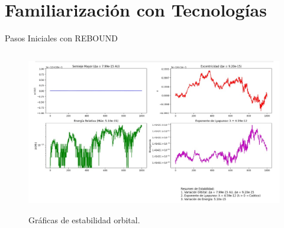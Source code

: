 \section[Familiarización]{Familiarización con Tecnologías}
\begin{frame}{Pasos Iniciales con REBOUND}
    \begin{columns}[T]
        \begin{column}{0.55\textwidth}
            \begin{figure}
                \centering
                \href{run:C:/Users/emicr/Documents/CODIGOS_FUENTES/TrabajoTerminal/collision_of_two_bodies/tests/prueba_2.ipynb}{%
                \includegraphics[width=\textwidth]{img/conclusion/metricas.jpeg}
                }
                \caption{Gráficas de estabilidad orbital.}
            \end{figure}
        \end{column}


\end{columns}
\end{frame}
